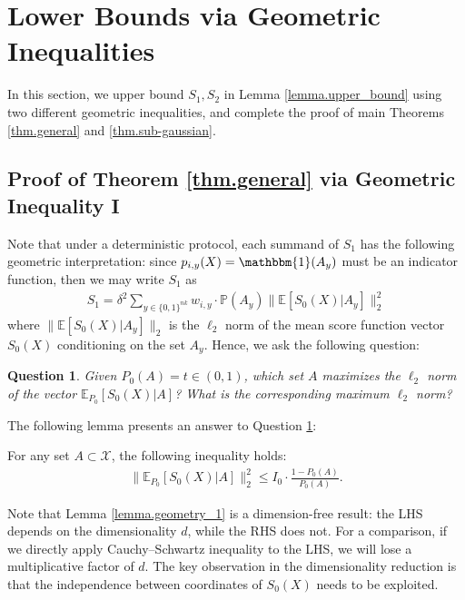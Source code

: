 \documentclass[final,12pt]{colt2018} %
\def \bP {\mathbb{P}}
\def \bE {\mathbb{E}}
\newcommand{\calX}{{\mathcal{X}}}
\newtheorem{question}{Question}
\begin{document}
\section{Lower Bounds via Geometric Inequalities}\label{sec.geo}
In this section, we upper bound $S_1, S_2$ in Lemma \ref{lemma.upper_bound} using two different geometric inequalities, and complete the proof of main Theorems \ref{thm.general} and \ref{thm.sub-gaussian}. 

\subsection{Proof of Theorem \ref{thm.general} via Geometric Inequality I}
Note that under a deterministic protocol, each summand of $S_1$ has the following geometric interpretation: since $p_{i,y}(X)=\mathbbm{1}(A_y)$ must be an indicator function, then we may write $S_1$ as
\begin{align*}
S_1 = \delta^2 \sum_{y\in \{0,1\}^{nk}} w_{i,y}\cdot \bP(A_y)\|\bE [S_0(X)|A_y]\|_2^2
\end{align*}
where $\|\bE [S_0(X)|A_y]\|_2$ is the $\ell_2$ norm of the mean score function vector $S_0(X)$ conditioning on the set $A_y$. Hence, we ask the following question: 
\begin{question}\label{question_1}
	Given $P_0(A)=t\in (0,1)$, which set $A$ maximizes the $\ell_2$ norm of the vector $\bE_{P_0}[S_0(X)|A]$? What is the corresponding maximum $\ell_2$ norm?
\end{question}

The following lemma presents an answer to Question \ref{question_1}:
\begin{lemma}\label{lemma.geometry_1}
	For any set $A\subset \calX$, the following inequality holds:
	\begin{align*}
	\|\bE_{P_0}[S_0(X)|A]\|_2^2 \le I_0\cdot \frac{1-P_0(A)}{P_0(A)}.
	\end{align*}
\end{lemma}

Note that Lemma \ref{lemma.geometry_1} is a dimension-free result: the LHS depends on the dimensionality $d$, while the RHS does not. For a comparison, if we directly apply Cauchy--Schwartz inequality to the LHS, we will lose a multiplicative factor of $d$. The key observation in the dimensionality reduction is that the independence between coordinates of $S_0(X)$ needs to be exploited. 
\end{document}
